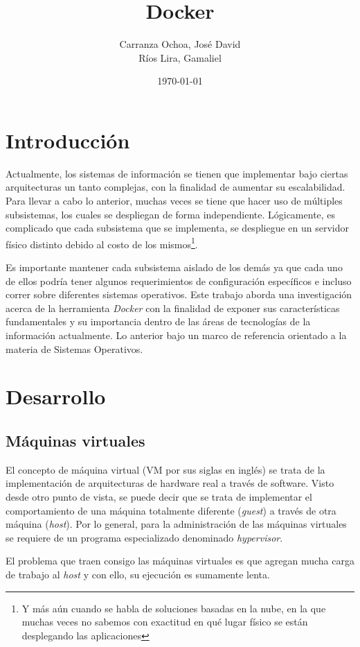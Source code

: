 \documentclass[12pt, letterpaper]{article}
\title{Docker}
\author{Carranza Ochoa, José David \\ Ríos Lira, Gamaliel}
\date{\today}
\begin{document}
\maketitle

\section{Introducción}
Actualmente, los sistemas de información se tienen que implementar bajo 
ciertas arquitecturas un tanto complejas, con la finalidad de aumentar su 
escalabilidad. Para llevar a cabo lo anterior, muchas veces se tiene que hacer 
uso de múltiples subsistemas, los cuales se despliegan de forma independiente.  
Lógicamente, es complicado que cada subsistema que se implementa, se 
despliegue en un servidor físico distinto debido al costo de los 
mismos\footnote{Y más aún cuando se habla de soluciones basadas en la nube, en 
la que muchas veces no sabemos con exactitud en qué lugar físico se están 
desplegando las aplicaciones}.

Es importante mantener cada subsistema aislado de los demás ya que cada uno de 
ellos podría tener algunos requerimientos de configuración específicos e 
incluso correr sobre diferentes sistemas operativos. Este trabajo aborda una 
investigación acerca de la herramienta \textit{Docker} con la finalidad de 
exponer sus características fundamentales y su importancia dentro de las áreas 
de tecnologías de la información actualmente. Lo anterior bajo un marco de 
referencia orientado a la materia de Sistemas Operativos.


\section{Desarrollo}
\subsection{Máquinas virtuales}
El concepto de máquina virtual (VM por sus siglas en inglés) se trata de la 
implementación de arquitecturas de hardware real a través de software. Visto 
desde otro punto de vista, se puede decir que se trata de implementar el 
comportamiento de una máquina totalmente diferente (\textit{guest}) a través 
de otra máquina (\textit{host}). Por lo general, para la administración de las 
máquinas virtuales se requiere de un programa especializado denominado 
\textit{hypervisor}.

El problema que traen consigo las máquinas virtuales es que agregan mucha 
carga de trabajo al \textit{host} y con ello, su ejecución es sumamente lenta.
\end{document}
